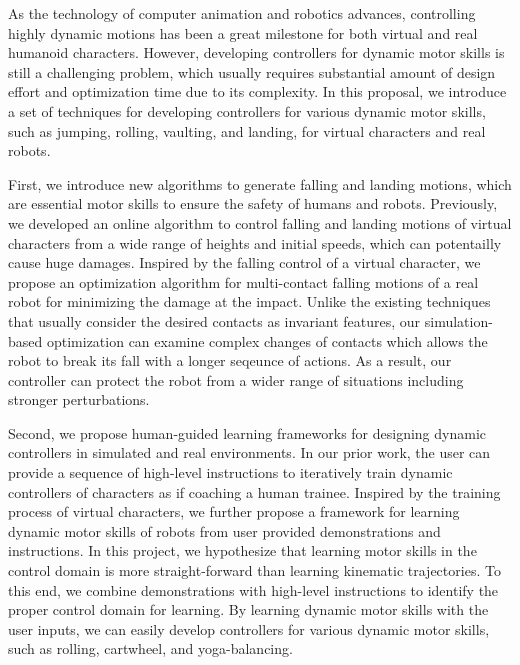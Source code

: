 \begin{summary}
  As the technology of computer animation and robotics advances,
  controlling highly dynamic motions
  has been a great milestone for both virtual and real humanoid characters.
  However, developing controllers for dynamic motor skills is still 
  a challenging problem, which usually requires substantial amount of 
  design effort and optimization time due to its complexity.
  In this proposal, we introduce a set of techniques for developing
  controllers for various dynamic motor skills, such as jumping, rolling, 
  vaulting, and landing, for virtual characters and real robots.

  First, we introduce new algorithms to generate falling and landing motions,
  which are essential motor skills to ensure the safety of humans and robots.
  Previously, we  developed an online algorithm to control falling and 
  landing motions of virtual characters from a wide range of heights 
  and initial speeds, which can potentailly cause huge damages.
  Inspired by the falling control of a virtual character, 
  we propose an optimization algorithm for multi-contact falling
  motions of a real robot for minimizing the damage at the impact.
  Unlike the existing techniques that usually consider the desired contacts 
  as invariant features, 
  our simulation-based optimization can examine complex changes
  of contacts which allows the robot to break its fall with a longer
  seqeunce of actions.
  As a result, our controller can protect the robot from a wider
  range of situations including stronger perturbations.


  Second, we propose human-guided learning frameworks for designing dynamic
  controllers in simulated and real environments.
  In our prior work, the user can provide a sequence of high-level instructions
  to iteratively train dynamic controllers of characters 
  as if coaching a human trainee.
  Inspired by the training process of virtual characters,
  we further propose a framework for learning dynamic motor skills
  of robots from user provided demonstrations and instructions.
  In this project, we hypothesize that learning motor skills in the control domain
  is more straight-forward than learning kinematic trajectories.
  To this end, we combine demonstrations with high-level instructions
  to identify the proper control domain for learning.
  By learning dynamic motor skills with the user inputs, we can easily develop
  controllers for various dynamic motor skills, such as rolling,
  cartwheel, and yoga-balancing.


\end{summary}
